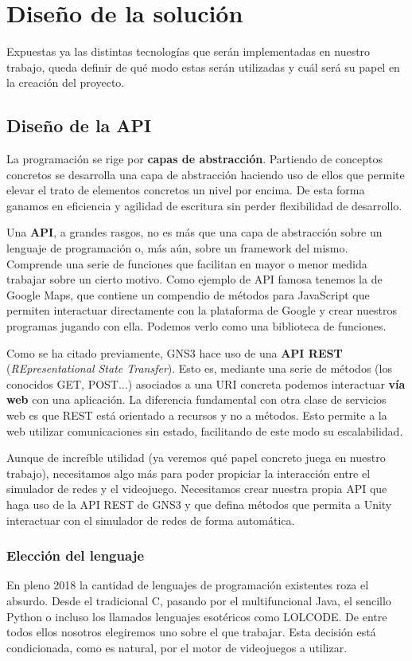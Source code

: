 \chapter{Diseño de la solución}\label{chap:Design}

Expuestas ya las distintas tecnologías que serán implementadas en nuestro trabajo, queda definir de qué modo estas serán utilizadas y cuál será su papel en la creación del proyecto.

\section{Diseño de la API}\label{sec:dis_api}
La programación se rige por \textbf{capas de abstracción}. Partiendo de conceptos concretos se desarrolla una capa de abstracción haciendo uso de ellos que permite elevar el trato de elementos concretos un nivel por encima\cite{abstraction}. De esta forma ganamos en eficiencia y agilidad de escritura sin perder flexibilidad de desarrollo.

Una \textbf{API}, a grandes rasgos, no es más que una capa de abstracción sobre un lenguaje de programación o, más aún, sobre un framework del mismo. Comprende una serie de funciones que facilitan en mayor o menor medida trabajar sobre un cierto motivo. Como ejemplo de API famosa tenemos la de Google Maps, que contiene un compendio de métodos para JavaScript que permiten interactuar directamente con la plataforma de Google y crear nuestros programas jugando con ella\cite{googlemaps}. Podemos verlo como una biblioteca de funciones.

Como se ha citado previamente, GNS3 hace uso de una \textbf{API REST} (\textit{REpresentational State Transfer}). Esto es, mediante una serie de métodos (los conocidos GET, POST...) asociados a una URI concreta podemos interactuar \textbf{vía web} con una aplicación. La diferencia fundamental con otra clase de servicios web es que REST está orientado a recursos y no a métodos. Esto permite a la web utilizar comunicaciones sin estado, facilitando de este modo su escalabilidad\cite{REST}.

Aunque de increíble utilidad (ya veremos qué papel concreto juega en nuestro trabajo), necesitamos algo más para poder propiciar la interacción entre el simulador de redes y el videojuego. Necesitamos crear nuestra propia API que haga uso de la API REST de GNS3 y que defina métodos que permita a Unity interactuar con el simulador de redes de forma automática.

\subsection{Elección del lenguaje}
En pleno 2018 la cantidad de lenguajes de programación existentes roza el absurdo. Desde el tradicional C, pasando por el multifuncional Java, el sencillo Python o incluso los llamados lenguajes esotéricos como LOLCODE\cite{esotericlang}. De entre todos ellos nosotros elegiremos uno sobre el que trabajar. Esta decisión está condicionada, como es natural, por el motor de videojuegos a utilizar.

